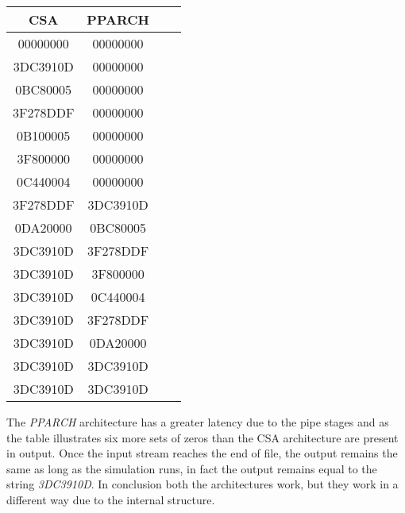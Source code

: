 \begin{table}[H]
\begin{center}
\begin{tabular}{|c|c|c|c|}				\hline
CSA		 	  & PPARCH 					\\ \hline
00000000   	  & 00000000               	\\ \hline
3DC3910D      & 00000000                \\ \hline
0BC80005      & 00000000                \\ \hline
3F278DDF      & 00000000                \\ \hline
0B100005      & 00000000                  \\ \hline
3F800000      & 00000000                  \\ \hline
0C440004      & 00000000                   \\ \hline
3F278DDF      & 3DC3910D                  \\ \hline
0DA20000      & 0BC80005                   \\ \hline
3DC3910D      & 3F278DDF                  \\ \hline
3DC3910D      & 3F800000                   \\ \hline
3DC3910D      & 0C440004                   \\ \hline
3DC3910D      & 3F278DDF                   \\ \hline
3DC3910D      & 0DA20000                   \\ \hline
3DC3910D      & 3DC3910D                   \\ \hline
3DC3910D      & 3DC3910D                   \\ \hline
\end{tabular}
\end{center}
\end{table}

The \textit{PPARCH} architecture has a greater latency due to the pipe stages and as the table illustrates six more sets of zeros than the CSA architecture are present in output. Once the input stream reaches the end of file, the output remains the same as long as the simulation runs, in fact the output remains equal to the string \textit{3DC3910D}. In conclusion both the architectures work, but they work in a different way due to the internal structure.


